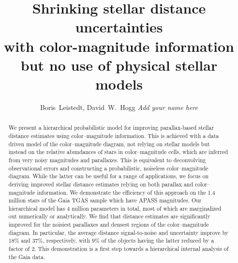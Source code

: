 \documentclass[manuscript, letterpaper]{aastex6}
\begin{document}
 
\title{Shrinking stellar distance uncertainties\\
 with color-magnitude information \\
  but no use of physical stellar models}
  


\author{
	Boris~Leistedt,
	David~W.~Hogg
	\textit{Add your name here}
	}


  

\begin{abstract}
We present a hierarchical probabilistic model for improving parallax-based stellar distance estimates using color--magnitude information. 
This is achieved with a data driven model of the color--magnitude diagram, not relying on stellar models but instead on the relative abundances of stars in color--magnitude cells, which are inferred from very noisy magnitudes and parallaxes.
This is equivalent to deconvolving observational errors and constructing a probabilistic, noiseless color--magnitude diagram.
While the latter can be useful for a range of applications, we focus on deriving improved stellar distance estimates relying on both parallax and color--magnitude information.
We demonstrate the efficiency of this approach on the 1.4 million stars of the Gaia TGAS sample which have APASS magnitudes.
Our hierarchical model has 4 million parameters in total, most of which are marginalized out numerically or analytically.
We find that distance estimates are significantly improved for the noisiest parallaxes and densest regions of the color--magnitude diagram. 
In particular, the average distance signal-to-noise and uncertainty improve by 18\% and 37\%, respectively, with 9\% of the objects having the latter reduced by a factor of 2. 
This demonstration is a first step towards a hierarchical internal analysis of the Gaia data.
\end{abstract}

\end{document}
